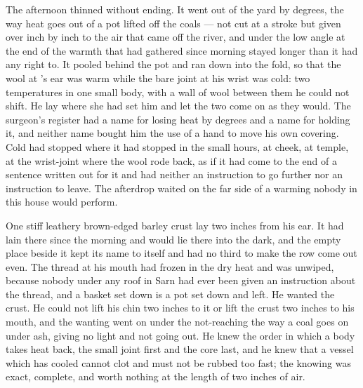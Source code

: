 The afternoon thinned without ending. It went out of the yard by degrees, the way heat goes out of a pot lifted off the coals --- not cut at a stroke but given over inch by inch to the air that came off the river, and under the low angle at the end of  the warmth that had gathered since morning stayed longer than it had any right to. It pooled behind the pot and ran down into the fold, so that the wool at 's ear was warm while the bare joint at his wrist was cold: two temperatures in one small body, with a wall of wool between them he could not shift. He lay where she had set him and let the two come on as they would. The surgeon's register had a name for losing heat by degrees and a name for holding it, and neither name bought him the use of a hand to move his own covering. Cold had stopped where it had stopped in the small hours, at cheek, at temple, at the wrist-joint where the wool rode back, as if it had come to the end of a sentence written out for it and had neither an instruction to go further nor an instruction to leave. The afterdrop waited on the far side of a warming nobody in this house would perform.

One stiff leathery brown-edged barley crust lay two inches from his ear. It had lain there since the morning and would lie there into the dark, and the empty place beside it kept its name to itself and had no third to make the row come out even. The thread at his mouth had frozen in the dry heat and was unwiped, because nobody under any roof in Sarn had ever been given an instruction about the thread, and a basket set down is a pot set down and left. He wanted the crust. He could not lift his chin two inches to it or lift the crust two inches to his mouth, and the wanting went on under the not-reaching the way a coal goes on under ash, giving no light and not going out. He knew the order in which a body takes heat back, the small joint first and the core last, and he knew that a vessel which has cooled cannot clot and must not be rubbed too fast; the knowing was exact, complete, and worth nothing at the length of two inches of air.

